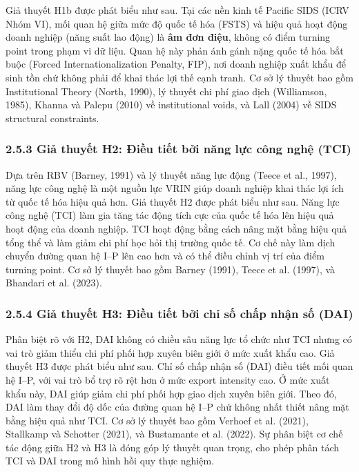 \documentclass[12pt,a4paper]{article}
\begin{document}
Giả thuyết H1b được phát biểu như sau. Tại các nền kinh tế Pacific SIDS
(ICRV Nhóm VI), mối quan hệ giữa mức độ quốc tế hóa (FSTS) và hiệu quả
hoạt động doanh nghiệp (năng suất lao động) là \textbf{âm đơn điệu},
không có điểm turning point trong phạm vi dữ liệu. Quan hệ này phản ánh
gánh nặng quốc tế hóa bắt buộc (Forced Internationalization Penalty,
FIP), nơi doanh nghiệp xuất khẩu để sinh tồn chứ không phải để khai thác
lợi thế cạnh tranh. Cơ sở lý thuyết bao gồm Institutional Theory (North,
1990), lý thuyết chi phí giao dịch (Williamson, 1985), Khanna và Palepu
(2010) về institutional voids, và Lall (2004) về SIDS structural
constraints.

\hypertarget{253-giux1ea3-thuyux1ebft-h2-ux111iux1ec1u-tiux1ebft-bux1edfi-nux103ng-lux1ef1c-cuxf4ng-nghux1ec7-tci}{%
\subsubsection{2.5.3 Giả thuyết H2: Điều tiết bởi năng lực công nghệ
(TCI)}\label{253-giux1ea3-thuyux1ebft-h2-ux111iux1ec1u-tiux1ebft-bux1edfi-nux103ng-lux1ef1c-cuxf4ng-nghux1ec7-tci}}

Dựa trên RBV (Barney, 1991) và lý thuyết năng lực động (Teece et al.,
1997), năng lực công nghệ là một nguồn lực VRIN giúp doanh nghiệp khai
thác lợi ích từ quốc tế hóa hiệu quả hơn. Giả thuyết H2 được phát biểu
như sau. Năng lực công nghệ (TCI) làm gia tăng tác động tích cực của
quốc tế hóa lên hiệu quả hoạt động của doanh nghiệp. TCI hoạt động bằng
cách nâng mặt bằng hiệu quả tổng thể và làm giảm chi phí học hỏi thị
trường quốc tế. Cơ chế này làm dịch chuyển đường quan hệ I--P lên cao
hơn và có thể điều chỉnh vị trí của điểm turning point. Cơ sở lý thuyết
bao gồm Barney (1991), Teece et al. (1997), và Bhandari et al. (2023).

\hypertarget{254-giux1ea3-thuyux1ebft-h3-ux111iux1ec1u-tiux1ebft-bux1edfi-chux1ec9-sux1ed1-chux1ea5p-nhux1eadn-sux1ed1-dai}{%
\subsubsection{2.5.4 Giả thuyết H3: Điều tiết bởi chỉ số chấp nhận số
(DAI)}\label{254-giux1ea3-thuyux1ebft-h3-ux111iux1ec1u-tiux1ebft-bux1edfi-chux1ec9-sux1ed1-chux1ea5p-nhux1eadn-sux1ed1-dai}}

Phân biệt rõ với H2, DAI không có chiều sâu năng lực tổ chức như TCI
nhưng có vai trò giảm thiểu chi phí phối hợp xuyên biên giới ở mức xuất
khẩu cao. Giả thuyết H3 được phát biểu như sau. Chỉ số chấp nhận số
(DAI) điều tiết mối quan hệ I--P, với vai trò bổ trợ rõ rệt hơn ở mức
export intensity cao. Ở mức xuất khẩu này, DAI giúp giảm chi phí phối
hợp giao dịch xuyên biên giới. Theo đó, DAI làm thay đổi độ dốc của
đường quan hệ I--P chứ không nhất thiết nâng mặt bằng hiệu quả như TCI.
Cơ sở lý thuyết bao gồm Verhoef et al. (2021), Stallkamp và Schotter
(2021), và Bustamante et al. (2022). Sự phân biệt cơ chế tác động giữa
H2 và H3 là đóng góp lý thuyết quan trọng, cho phép phân tách TCI và DAI
trong mô hình hồi quy thực nghiệm.
\end{document}
